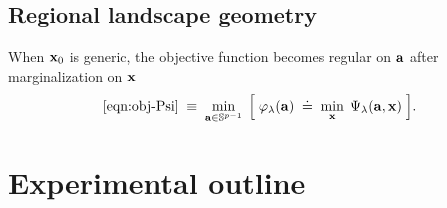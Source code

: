 \documentclass{article}
\numberwithin{equation}{section}
\begin{document}
\subsection{Regional landscape geometry}
When $\mathbf{x}_0$ is generic, the objective function becomes regular on $\mathbf{a}$ after marginalization on $\mathbf{x}$
\begin{equation} \label{eqn:obj-phi}
  \eqref{eqn:obj-Psi} \;\equiv\; \min_{\mathbf{a} \in \mathbb{S}^{p-1}} \;\Big[\;
    \varphi_\lambda(\mathbf{a}) \;\doteq\; \min_{\mathbf{x}}\; \Psi_\lambda(\mathbf{a}, \mathbf{x})
  \;\Big].
\end{equation}



\section{Experimental outline}
\end{document}
